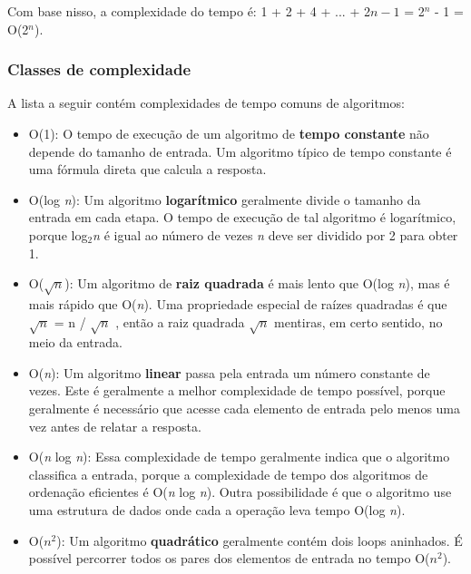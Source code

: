 Com base nisso, a complexidade do tempo é:
1 + 2 + 4 + ... + 2$n-1$ = 2$^n$ - 1 = O(2$^n$).

\subsubsection{Classes de complexidade}

A lista a seguir contém complexidades de tempo comuns de algoritmos:

\begin{itemize}

    \item O(1): O tempo de execução de um algoritmo de \textbf{tempo constante} não depende do tamanho de entrada. Um algoritmo típico de tempo constante é uma fórmula direta que calcula a resposta.

    \item O(log \textit{n}): Um algoritmo \textbf{logarítmico} geralmente divide o tamanho da entrada em cada etapa. O tempo de execução de tal algoritmo é logarítmico, porque log$_2$\textit{n} é igual ao número de vezes \textit{n} deve ser dividido por 2 para obter 1.

    \item O($\sqrt{\textit{n}}$): Um algoritmo de \textbf{raiz quadrada} é mais lento que O(log \textit{n}), mas é mais rápido que O(\textit{n}). Uma propriedade especial de raízes quadradas é que $\sqrt{\textit{n}}$ = n / $\sqrt{\textit{n}}$ , então a raiz quadrada $\sqrt{\textit{n}}$ mentiras, em certo sentido, no meio da entrada.

    \item O(\textit{n}): Um algoritmo \textbf{linear} passa pela entrada um número constante de vezes. Este é geralmente a melhor complexidade de tempo possível, porque geralmente é necessário que acesse cada elemento de entrada pelo menos uma vez antes de relatar a resposta.

    \item O(\textit{n} log \textit{n}): Essa complexidade de tempo geralmente indica que o algoritmo classifica a entrada, porque a complexidade de tempo dos algoritmos de ordenação eficientes é O(\textit{n} log \textit{n}). Outra possibilidade é que o algoritmo use uma estrutura de dados onde cada a operação leva tempo O(log \textit{n}).

    \item O($n^2$): Um algoritmo \textbf{quadrático} geralmente contém dois loops aninhados. É possível percorrer todos os pares dos elementos de entrada no tempo O($n^2$).


\end{itemize}
